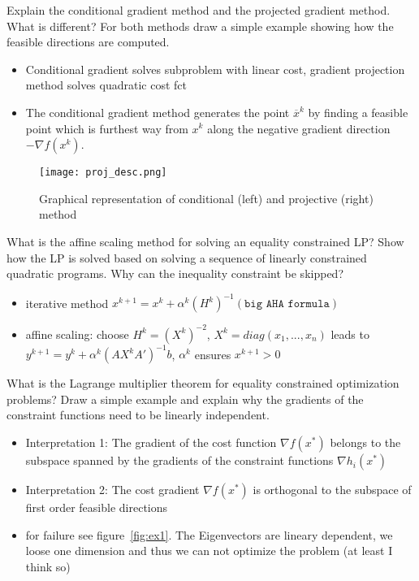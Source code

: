 \documentclass{article}
\begin{document}
\begin{question}
  Explain the conditional gradient method and the projected gradient method.  What is different? For
  both methods draw a simple example showing how the feasible directions are computed.
\end{question}
\begin{itemize}
\item Conditional gradient solves subproblem with linear cost, gradient projection method solves
  quadratic cost fct
\item The conditional gradient method generates the point $\overline{x}^k$ by finding a feasible
  point which is furthest way from $x^k$ along the negative gradient direction $-\nabla f (x^k )$.

\end{itemize}
\begin{figure}[H]
  \texttt{[image: proj\_desc.png]}
  \caption{Graphical representation of conditional (left) and projective (right)
    method\label{fig:proj_desc}}
\end{figure}

\begin{question}
  What is the affine scaling method for solving an equality constrained LP? Show how the LP is
  solved based on solving a sequence of linearly constrained quadratic programs. Why can the
  inequality constraint be skipped?
\end{question}
\begin{itemize}
\item iterative method $x^{k+1} = x^k + \alpha^k (H^k)^{-1} (\texttt{big AHA formula})$
\item affine scaling: choose $H^k = (X^k)^{-2}$, $X^k = diag(x_1, ..., x_n)$ leads to
  $y^{k+1} = y^k + \alpha^k (AX^k A' )^{-1} b $, $\alpha^k$ ensures $x^{k+1} > 0$
\end{itemize}

\begin{question}
  What is the Lagrange multiplier theorem for equality constrained optimization problems? Draw a
  simple example and explain why the gradients of the constraint functions need to be linearly
  independent.
\end{question}
\begin{itemize}
\item Interpretation 1: The gradient of the cost function $\nabla f (x^*)$
  belongs to the subspace spanned by the gradients of the
  constraint functions $\nabla h_i (x^* )$
\item Interpretation 2: The cost gradient $\nabla f (x^* )$ is orthogonal to
  the subspace of first order feasible directions
\item for failure see figure~\ref{fig:ex1}. The Eigenvectors are lineary dependent, we loose one
  dimension and thus we can not optimize the problem (at least I think so)
\end{itemize}
\end{document}
